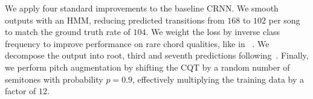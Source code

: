 



We apply four standard improvements to the baseline CRNN. We smooth outputs with an HMM, reducing predicted transitions from $168$ to $102$ per song to match the ground truth rate of $104$. We weight the loss by inverse class frequency to improve performance on rare chord qualities, like in ~\cite{ACRLargeVocab1}. We decompose the output into root, third and seventh predictions following~\cite{StructuredTraining,chordformer,discordharmony}. Finally, we perform pitch augmentation by shifting the CQT by a random number of semitones with probability $p=0.9$, effectively multiplying the training data by a factor of $12$.



